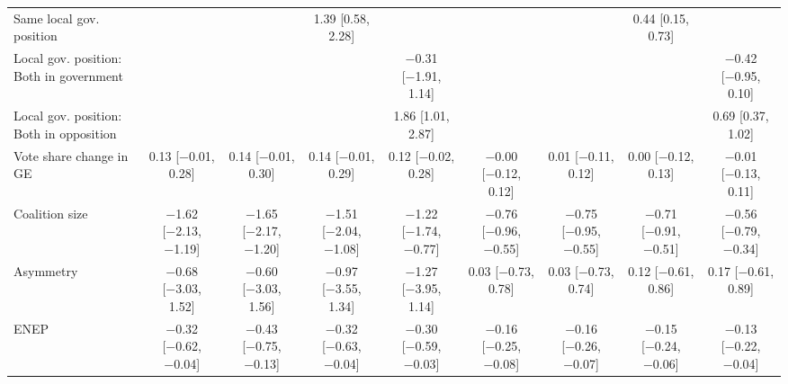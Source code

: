 \begin{tabular}{lcccc|cccc}
Same local gov. position               &                                           &                                           & \num{1.39} [\num{0.58}, \num{2.28}]    &                                           &                                           &                                           & \num{0.44} [\num{0.15}, \num{0.73}]    &                                           \\
Local gov. position: Both in government &                                           &                                           &                                           & \num{-0.31} [\num{-1.91}, \num{1.14}]  &                                           &                                           &                                           & \num{-0.42} [\num{-0.95}, \num{0.10}]  \\
Local gov. position: Both in opposition &                                           &                                           &                                           & \num{1.86} [\num{1.01}, \num{2.87}]    &                                           &                                           &                                           & \num{0.69} [\num{0.37}, \num{1.02}]    \\
Vote share change in GE                             & \num{0.13} [\num{-0.01}, \num{0.28}]   & \num{0.14} [\num{-0.01}, \num{0.30}]   & \num{0.14} [\num{-0.01}, \num{0.29}]   & \num{0.12} [\num{-0.02}, \num{0.28}]   & \num{-0.00} [\num{-0.12}, \num{0.12}]  & \num{0.01} [\num{-0.11}, \num{0.12}]   & \num{0.00} [\num{-0.12}, \num{0.13}]   & \num{-0.01} [\num{-0.13}, \num{0.11}]  \\
Coalition size            & \num{-1.62} [\num{-2.13}, \num{-1.19}] & \num{-1.65} [\num{-2.17}, \num{-1.20}] & \num{-1.51} [\num{-2.04}, \num{-1.08}] & \num{-1.22} [\num{-1.74}, \num{-0.77}] & \num{-0.76} [\num{-0.96}, \num{-0.55}] & \num{-0.75} [\num{-0.95}, \num{-0.55}] & \num{-0.71} [\num{-0.91}, \num{-0.51}] & \num{-0.56} [\num{-0.79}, \num{-0.34}] \\
Asymmetry                                & \num{-0.68} [\num{-3.03}, \num{1.52}]  & \num{-0.60} [\num{-3.03}, \num{1.56}]  & \num{-0.97} [\num{-3.55}, \num{1.34}]  & \num{-1.27} [\num{-3.95}, \num{1.14}]  & \num{0.03} [\num{-0.73}, \num{0.78}]   & \num{0.03} [\num{-0.73}, \num{0.74}]   & \num{0.12} [\num{-0.61}, \num{0.86}]   & \num{0.17} [\num{-0.61}, \num{0.89}]   \\
ENEP                             & \num{-0.32} [\num{-0.62}, \num{-0.04}] & \num{-0.43} [\num{-0.75}, \num{-0.13}] & \num{-0.32} [\num{-0.63}, \num{-0.04}] & \num{-0.30} [\num{-0.59}, \num{-0.03}] & \num{-0.16} [\num{-0.25}, \num{-0.08}] & \num{-0.16} [\num{-0.26}, \num{-0.07}] & \num{-0.15} [\num{-0.24}, \num{-0.06}] & \num{-0.13} [\num{-0.22}, \num{-0.04}] \\

\end{tabular}
